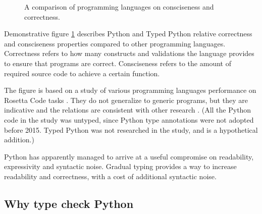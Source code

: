 \begin{figure}[h!]
    \centering
    \caption{A comparison of programming languages on consciseness and correctness.}
    \label{fig:language_comparison}
\end{figure}

Demonstrative figure \ref{fig:language_comparison} describes Python and Typed Python relative correctness and consciseness properties compared to other programming languages. Correctness refers to how many constructs and validations the language provides to ensure that programs are correct. Consciseness refers to the amount of required source code to achieve a certain function.

The figure is based on a study of various programming languages performance on Rosetta Code tasks \cite{nanz_comparative_2015}. They do not generalize to generic programs, but they are indicative and the relations are consistent with other research \cite{ray_codequality_2014}. (All the Python code in the study was untyped, since Python type annotations were not adopted before 2015. Typed Python was not researched in the study, and is a hypothetical addition.)

Python has apparently managed to arrive at a useful compromise on readability, expressivity and syntactic noise. Gradual typing provides a way to increase readability and correctness, with a cost of additional syntactic noise.

\subsection{Why type check Python}

